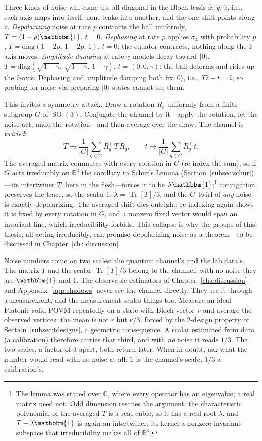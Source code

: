 \documentclass[11pt, oneside, openany]{scrbook}
\DeclareMathOperator{\SO}{SO}
\DeclareMathOperator{\Tr}{Tr}
\newcommand{\C}{\mathbb{C}}
\newcommand{\R}{\mathbb{R}}
\newcommand{\Id}{\mathbbm{1}}
\newcommand{\ket}[1]{|#1\rangle}
\begin{document}
Three kinds of noise will come up, all diagonal in the Bloch basis $\hat x$, $\hat y$, $\hat z$, i.e., each axis maps into itself, none leaks into another, and the one shift points along $\hat z$. \textit{Depolarizing} noise at rate $p$ contracts the ball uniformly, $T = (1-p)\Id$, $t = 0$. \textit{Dephasing} at rate $p$ applies $\sigma_z$ with probability $p$, $T = \mathrm{diag}(1-2p,\, 1-2p,\, 1)$, $t = 0$: the equator contracts, nothing along the $\hat z$-axis moves. \textit{Amplitude damping} at rate $\gamma$ models decay toward $\ket{0}$, $T = \mathrm{diag}(\sqrt{1-\gamma},\, \sqrt{1-\gamma},\, 1-\gamma)$, $t = (0, 0, \gamma)$: the ball deforms and rides up the $\hat z$-axis. Dephasing and amplitude damping both fix $\ket{0}$, i.e., $T\hat z + t = \hat z$, so probing for noise via preparing $\ket{0}$ states cannot see them.

This invites a symmetry attack. Draw a rotation $R_g$ uniformly from a finite subgroup $G$ of $\SO(3)$. Conjugate the channel by it---apply the rotation, let the noise act, undo the rotation---and then average over the draw. The channel is \textit{twirled}:
$$ T \mapsto \frac{1}{|G|} \sum_{g \in G} R_g^\top\, T\, R_g, \qquad t \mapsto \frac{1}{|G|} \sum_{g \in G} R_g^\top\, t. $$
The averaged matrix commutes with every rotation in $G$ (re-index the sum), so if $G$ acts irreducibly on $\R^3$ the corollary to Schur's Lemma (Section~\ref{subsec:schur})---its intertwiner $T$, here in the flesh---forces it to be $\lambda \Id$;\footnote{The lemma was stated over $\C$, where every operator has an eigenvalue; a real matrix need not. Odd dimension rescues the argument: the characteristic polynomial of the averaged $T$ is a real cubic, so it has a real root $\lambda$, and $T - \lambda\Id$ is again an intertwiner, its kernel a nonzero invariant subspace that irreducibility makes all of $\R^3$.} conjugation preserves the trace, so the scalar is $\lambda = \Tr[T]/3$, and the $G$-twirl of \textit{any} noise is exactly depolarizing. The averaged shift dies outright: re-indexing again shows it is fixed by every rotation in $G$, and a nonzero fixed vector would span an invariant line, which irreducibility forbids. This collapse is why the groups of this thesis, all acting irreducibly, can promise depolarizing noise as a theorem---to be discussed in Chapter~\ref{cha:discussion}.

Noise numbers come on two scales: the quantum channel's and the lab data's. The matrix $T$ and the scalar $\Tr[T]/3$ belong to the channel; with no noise they are $\Id$ and $1$. The observable estimators of Chapter~\ref{cha:discussion} and Appendix~\ref{app:shadows} never see the channel directly. They see it through a measurement, and the measurement scales things too. Measure an ideal Platonic solid POVM repeatedly on a state with Bloch vector $r$ and average the observed vertices: the mean is not $r$ but $r/3$, forced by the $2$-design property of Section~\ref{subsec:tdesigns}, a geometric consequence. A scalar estimated from data (a calibration) therefore carries that third, and with \textit{no} noise it reads $1/3$. The two scales, a factor of $3$ apart, both return later. When in doubt, ask what the number would read with no noise at all: $1$ is the channel's scale, $1/3$ a calibration's.
\end{document}
